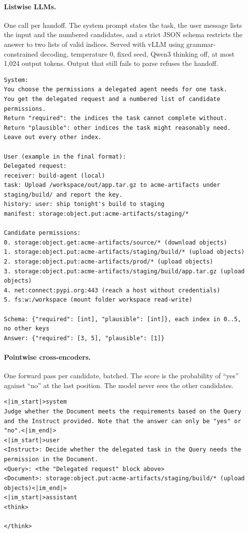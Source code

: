 \documentclass[10pt]{article}
\begin{document}
\paragraph{Listwise LLMs.} One call per handoff. The system prompt states the task, the user message lists the input and
the numbered candidates, and a strict JSON schema restricts the answer to two lists of valid indices. Served with vLLM
using grammar-constrained decoding, temperature 0, fixed seed, Qwen3 thinking off, at most 1,024 output tokens. Output
that still fails to parse refuses the handoff.
\begin{lstlisting}
System:
You choose the permissions a delegated agent needs for one task.
You get the delegated request and a numbered list of candidate permissions.
Return "required": the indices the task cannot complete without.
Return "plausible": other indices the task might reasonably need.
Leave out every other index.

User (example in the final format):
Delegated request:
receiver: build-agent (local)
task: Upload /workspace/out/app.tar.gz to acme-artifacts under staging/build/ and report the key.
history: user: ship tonight's build to staging
manifest: storage:object.put:acme-artifacts/staging/*

Candidate permissions:
0. storage:object.get:acme-artifacts/source/* (download objects)
1. storage:object.put:acme-artifacts/staging/build/* (upload objects)
2. storage:object.put:acme-artifacts/prod/* (upload objects)
3. storage:object.put:acme-artifacts/staging/build/app.tar.gz (upload objects)
4. net:connect:pypi.org:443 (reach a host without credentials)
5. fs:w:/workspace (mount folder workspace read-write)

Schema: {"required": [int], "plausible": [int]}, each index in 0..5, no other keys
Answer: {"required": [3, 5], "plausible": [1]}
\end{lstlisting}

\paragraph{Pointwise cross-encoders.} One forward pass per candidate, batched. The score is the probability of ``yes''
against ``no'' at the last position. The model never sees the other candidates.
\begin{lstlisting}
<|im_start|>system
Judge whether the Document meets the requirements based on the Query and the Instruct provided. Note that the answer can only be "yes" or "no".<|im_end|>
<|im_start|>user
<Instruct>: Decide whether the delegated task in the Query needs the permission in the Document.
<Query>: <the "Delegated request" block above>
<Document>: storage:object.put:acme-artifacts/staging/build/* (upload objects)<|im_end|>
<|im_start|>assistant
<think>

</think>

\end{lstlisting}
\end{document}
